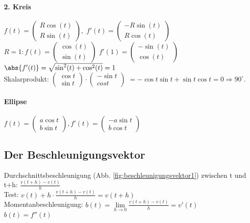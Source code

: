 \paragraph{2. Kreis} 
$ f(t) = \left( \begin{array}{c} R \cos(t)\\ R\sin (t)\end{array}\right), $
$f'(t) = \left( \begin{array}{c} - R \sin(t)\\ R \cos(t)\end{array}\right)$\\
$R=1: f(t) = \left( \begin{array}{c} \cos(t)\\ \sin (t)\end{array}\right) $
$f'(1) = \left( \begin{array}{c} - \sin(t)\\ \cos(t)\end{array}\right)$ \\
$\abs{f'(t)} = \sqrt{\sin^2 (t) + \cos^2(t)}=1 $\\
Skalarprodukt: 
$\left( \begin{array}{c} \cos t\\\sin t\end{array}\right) \cdot \left( \begin{array}{c} -\sin t\\ cos t\end{array}\right) $
$= -\cos t \sin t + \sin t \cos t = 0 \Rightarrow 90^\circ $.

\paragraph{Ellipse}
$ f(t)=\left( \begin{array}{c} a \cos t\\ b \sin t \end{array}\right), f'(t)=\left( \begin{array}{c} -a \sin t\\ b \cos t\end{array}\right)$

\subsection{Der Beschleunigungsvektor}
Durchschnittsbeschleunigung (Abb. \ref{fig:beschleunigungsvektor1}) zwischen t und t+h: 
$ \frac{v(t+h)-v(t)}{h}$\\
Test: $ v(t)+ h\cdot \frac{v(t+h)-v(t)}{h} = v(t+h)$\\
Momentanbeschleunigung: 
$ b(t)=\lim\limits_{h\rightarrow 0} \frac{v(t+h)-v(t)}{h} = v'(t)$\\
$ b(t)=f''(t)$

